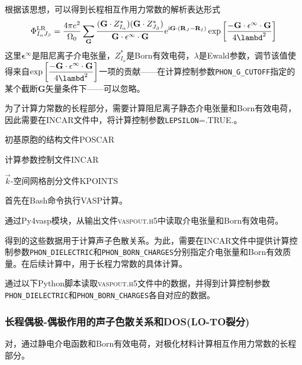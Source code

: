 根据该思想，可以得到长程相互作用力常数的解析表达形式
\begin{displaymath}
	\Phi_{I_{\alpha}J_{\beta}}^{\mathrm{LR}}=\dfrac{4\pi e^2}{\Omega_0}\sum_{\mathbf{G}}\dfrac{(\mathbf{G}\cdot Z_{I_{\alpha}}^{\ast})(\mathbf{G}\cdot Z_{J_{\beta}}^{\ast})}{\mathbf{G}\cdot\mathbf{\epsilon}^{\infty}\cdot\mathbf{G}}\mathrm{e}^{\mathrm{i}\mathbf{G}\cdot(\mathbf{R}_J-\mathbf{R}_I)}\exp\left[ \dfrac{-\mathbf{G}\cdot\mathbf{\epsilon}^{\infty}\cdot\mathbf{G}}{4\lambd^2} \right]
\end{displaymath}
这里$\mathbf{\epsilon}^{\infty}$是阻尼离子介电张量，$Z_{I_{\alpha}}^{\ast}$是\textrm{Born}有效电荷，$\lambda$是\textrm{Ewald}参数，调节该值使得来自$\exp\left[ \dfrac{-\mathbf{G}\cdot\mathbf{\epsilon}^{\infty}\cdot\mathbf{G}}{4\lambd^2} \right]$一项的贡献——在计算控制参数\texttt{PHON\_G\_CUTOFF}指定的某个截断$\mathbf{G}$矢量条件下——可以忽略。

为了计算力常数的长程部分，需要计算阻尼离子静态介电张量和\textrm{Born}有效电荷，因此需要在\textrm{INCAR}文件中，将计算控制参数\texttt{LEPSILON}=\textrm{.TRUE.}。

初基原胞的结构文件\textrm{POSCAR}

计算参数控制文件\textrm{INCAR}

$\vec k$-空间网格剖分文件\textrm{KPOINTS}

首先在\textrm{Bash}命令执行\textrm{VASP}计算。

通过\textrm{Py4vasp}模块，从输出文件\textsc{vaspout.h5}中读取介电张量和\textrm{Born}有效电荷。

得到的这些数据用于计算声子色散关系。为此，需要在\textrm{INCAR}文件中提供计算控制参数\texttt{PHON\_DIELECTRIC}和\texttt{PHON\_BORN\_CHARGES}分别指定介电张量和\textrm{Born}有效质量。在后续计算中，用于长程力常数的具体计算。

通过以下\textrm{Python}脚本读取\textsc{vaspout.h5}文件中的数据，并得到计算控制参数\texttt{PHON\_DIELECTRIC}和\texttt{PHON\_BORN\_CHARGES}各自对应的数据。

\subsubsection{长程偶极-偶极作用的声子色散关系和\rm{DOS}(\rm{LO-TO}裂分)}
对，通过静电介电函数和\textrm{Born}有效电荷，对极化材料计算相互作用力常数的长程部分。

